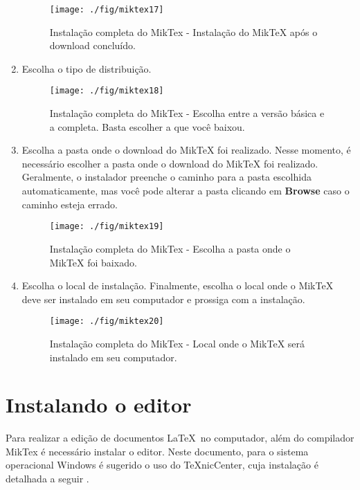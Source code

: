 \begin{enumerate}
\begin{figure}[H]
  \centering
  \texttt{[image: ./fig/miktex17]}
  \caption[Instalação do MikTeX após o download concluído]{Instalação completa do MikTex - Instalação do MikTeX após o download concluído.}
\end{figure}
\item Escolha o tipo de distribuição.
\begin{figure}[H]
  \centering
  \texttt{[image: ./fig/miktex18]}
  \caption[Escolha entre a versão básica e a completa]{Instalação completa do MikTex - Escolha entre a versão básica e a completa. Basta escolher a que você baixou.}
\end{figure}
\item Escolha a pasta onde o download do MikTeX foi realizado.
Nesse momento, é necessário escolher a pasta onde o download do MikTeX foi realizado. Geralmente, o instalador preenche o caminho para a pasta escolhida automaticamente, mas você pode alterar a pasta clicando em \textbf{Browse} caso o caminho esteja errado.
\begin{figure}[H]
  \centering
  \texttt{[image: ./fig/miktex19]}
  \caption[Escolha a pasta onde o MikTeX foi baixado]{Instalação completa do MikTex - Escolha a pasta onde o MikTeX foi baixado.}
\end{figure}
\item Escolha o local de instalação.
Finalmente, escolha o local onde o MikTeX deve ser instalado em seu computador e prossiga com a instalação. 
\begin{figure}[H]
  \centering
  \texttt{[image: ./fig/miktex20]}
  \caption[Local onde o MikTeX será instalado]{Instalação completa do MikTex - Local onde o MikTeX será instalado em seu computador.}
\end{figure}
\end{enumerate}

\section{Instalando o editor}

Para realizar a edição de documentos \LaTeX\ no computador, além do compilador MikTex é necessário instalar o editor. Neste documento, para o sistema operacional Windows é sugerido o uso do TeXnicCenter, cuja instalação é detalhada a seguir \cite{texnic}.

